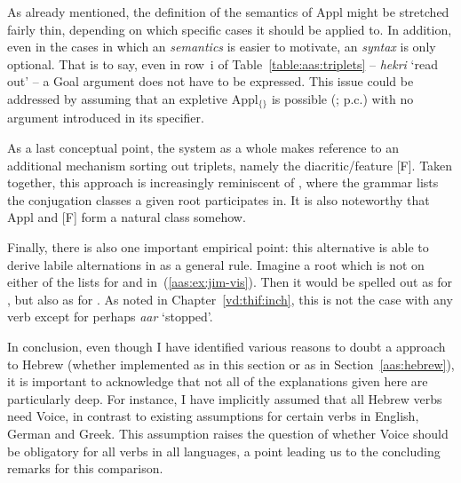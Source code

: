\begin{exe}
\begin{xlist}
\begin{exe}
\begin{exe}
\begin{xlist}
\begin{exe}
\begin{exe}
\begin{exe}
\begin{exe}
\begin{exe}
\begin{xlist}
\begin{exe}
\begin{exe}
\begin{xlist}
\begin{exe}
\begin{xlist}
\begin{exe}
\begin{xlist}
\begin{exe}
\begin{xlist}
As already mentioned, the definition of the semantics of Appl might be stretched fairly thin, depending on which specific cases it should be applied to. In addition, even in the cases in which an  \emph{semantics} is easier to motivate, an  \emph{syntax} is only optional. That is to say, even in row~i of Table~\ref{table:aas:triplets} -- \emph{hekri} `read out' -- a Goal argument does not have to be expressed. This issue could be addressed by assuming that an expletive Appl$_{\text{\{\}}}$ is possible (\citealt{wood15springer}; p.c.) with no argument introduced in its specifier.

As a last conceptual point, the system as a whole makes reference to an additional mechanism sorting out triplets, namely the diacritic/feature [F]. Taken together, this approach is increasingly reminiscent of \cite{arad05}, where the grammar lists the conjugation classes a given root participates in. It is also noteworthy that Appl and [F] form a natural class somehow. 

Finally, there is also one important empirical point: this alternative is able to derive labile alternations in {\tkal} as a general rule. Imagine a root  which is not on either of the lists for {\vds} and {\vzs} in~(\ref{aas:ex:jim-vis}). Then it would be spelled out as {\tkal} for {\vds}, but also as {\tkal} for {\vzs}. As noted in Chapter~\ref{vd:thif:inch}, this is not the case with any verb except for perhaps \emph{a{\ts}ar} `stopped'.

In conclusion, even though I have identified various reasons to doubt a  approach to Hebrew (whether implemented as in this section or as in Section~\ref{aas:hebrew}), it is important to acknowledge that not all of the explanations given here are particularly deep. For instance, I have implicitly assumed that all Hebrew verbs need Voice, in contrast to existing assumptions for certain verbs in English, German and Greek. This assumption raises the question of whether Voice should be obligatory for all verbs in all languages, a point leading us to the concluding remarks for this comparison.



\end{xlist}
\end{exe}
\end{xlist}
\end{exe}
\end{xlist}
\end{exe}
\end{xlist}
\end{exe}
\end{exe}
\end{xlist}
\end{exe}
\end{exe}
\end{exe}
\end{exe}
\end{exe}
\end{xlist}
\end{exe}
\end{exe}
\end{xlist}
\end{exe}

